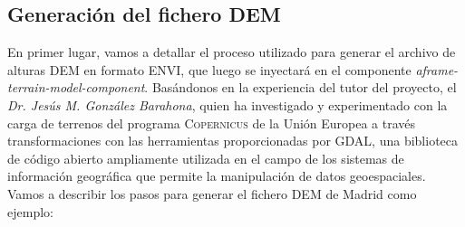 \documentclass[a4paper, 11pt]{book}
\begin{document}
\subsection{Generación del fichero DEM}
\label{sec:dem}
En primer lugar, vamos a detallar el proceso utilizado para generar el archivo de alturas \textsc{DEM} en formato \textsc{ENVI}, que luego se inyectará en el componente \emph{aframe-terrain-model-component}.
Basándonos en la experiencia del tutor del proyecto, el \emph{Dr. Jesús M. González Barahona}, quien ha investigado y experimentado con la carga de terrenos del programa \textsc{Copernicus} de la Unión Europea a través transformaciones con las herramientas proporcionadas por \textsc{GDAL}, una biblioteca de código abierto ampliamente utilizada en el campo de los sistemas de información geográfica que permite la manipulación de datos geoespaciales.
Vamos a describir los pasos para generar el fichero \textsc{DEM} de Madrid como ejemplo:
\label{manual:generacionDem}
\end{document}
